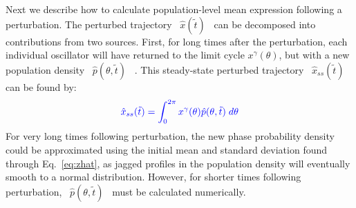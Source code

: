 \documentclass[11pt, letterpaper]{article}
\providecommand{\DIFadd}[1]{{\protect\color{blue}#1}} %
\providecommand{\DIFaddbegin}{} %
\providecommand{\DIFaddend}{} %
\begin{document}
Next we describe how to calculate \DIFaddbegin \DIFadd{population-level mean expression following a perturbation}\DIFaddend .
The perturbed trajectory \DIFaddbegin \DIFadd{\mbox{%
$\hat{x}(\tilde{t})$
}%
}\DIFaddend can be decomposed into contributions from two sources.
First, for long times after the perturbation, each individual oscillator will have returned to the limit cycle $x^\gamma(\theta)$, but with a new population density \DIFaddbegin \DIFadd{\mbox{%
$\hat{p}(\theta, \tilde{t})$
}%
}\DIFaddend .
This steady-state perturbed trajectory \DIFaddbegin \DIFadd{\mbox{%
$\hat{x}_{ss}(\tilde{t})$
}%
}\DIFaddend can be found by:
\DIFaddbegin \begin{equation}\DIFadd{
  \hat{x}_{ss}(\tilde{t}) = \int_0^{2\pi} x^\gamma(\theta) \hat{p}(\theta, \tilde{t}) \; d\theta
  \label{eq:xhatss}
}\end{equation}
\DIFaddend For very long times following perturbation, the new phase probability density could be approximated using the initial mean and standard deviation found through Eq.~\ref{eq:zhat}, as jagged profiles in the population density will eventually smooth to a normal distribution.
However, for shorter times following perturbation, \DIFaddbegin \DIFadd{\mbox{%
$\hat{p}(\theta, \tilde{t})$
}%
}\DIFaddend must be calculated numerically.
\end{document}

